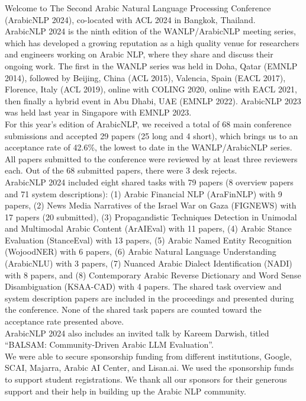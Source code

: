 Welcome to The Second Arabic Natural Language Processing Conference (ArabicNLP 2024), co-located with ACL 2024 in Bangkok, Thailand.\\  


ArabicNLP 2024 is the ninth edition of the WANLP/ArabicNLP meeting series, which has developed a growing reputation as a high quality venue for researchers and engineers working on Arabic NLP, where they share and discuss their ongoing work.  The first in the WANLP series was held in Doha, Qatar (EMNLP 2014), followed by Beijing, China (ACL 2015), Valencia, Spain (EACL 2017), Florence, Italy (ACL 2019), online with COLING 2020, online with EACL 2021, then finally a hybrid event in Abu Dhabi, UAE (EMNLP 2022). ArabicNLP 2023 was held last year in Singapore with EMNLP 2023.\\


For this year’s edition of ArabicNLP, we received a total of 68 main conference submissions and accepted 29 papers (25 long and 4 short), which brings us to an acceptance rate of 42.6\%, the lowest to date in the WANLP/ArabicNLP series. All papers submitted to the conference were reviewed by at least three reviewers each. Out of the 68 submitted papers, there were 3 desk rejects.\\


ArabicNLP 2024 included eight shared tasks with 79 papers (8 overview papers and 71 system descriptions):  (1) Arabic Financial NLP (AraFinNLP) with 9 papers, (2) News Media Narratives of the Israel War on Gaza (FIGNEWS) with 17 papers (20 submitted), (3) Propagandistic Techniques Detection in Unimodal and Multimodal Arabic Content (ArAIEval) with 11 papers,  (4) Arabic Stance Evaluation (StanceEval) with 13 papers, (5) Arabic Named Entity Recognition (WojoodNER) with 6 papers, (6) Arabic Natural Language Understanding (ArabicNLU) with 3 papers,  (7) Nuanced Arabic Dialect Identification (NADI) with 8 papers, and (8) Contemporary Arabic Reverse Dictionary and Word Sense Disambiguation (KSAA-CAD) with 4 papers. The shared task overview and system description papers are included in the proceedings and  presented during the conference. None of the shared task papers are counted toward the acceptance rate presented above.\\


ArabicNLP 2024 also includes an invited talk by Kareem Darwish, titled “BALSAM: Community-Driven Arabic LLM Evaluation”.\\


We were able to secure sponsorship funding from different institutions, Google, SCAI, Majarra, Arabic AI Center, and Lisan.ai.  
We used the sponsorship funds to support student registrations. We thank all our sponsors for their generous support and their help in building up the Arabic NLP community.\\


